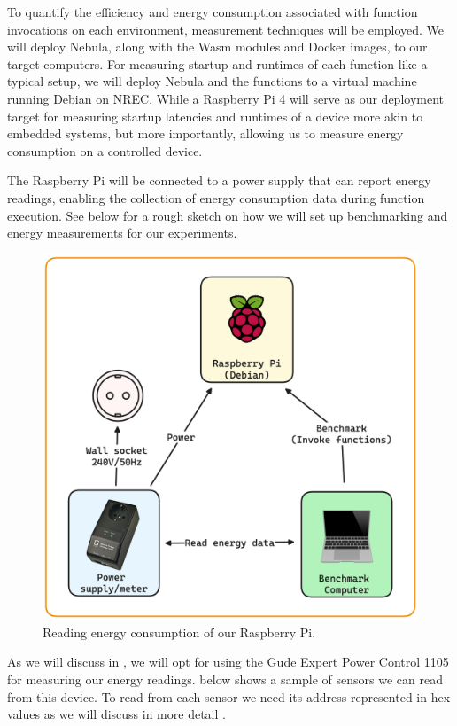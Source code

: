 \documentclass[
  table]{report}
\begin{document}
To quantify the efficiency and energy consumption associated with
function invocations on each environment, measurement techniques will be
employed. We will deploy Nebula, along with the \ac{Wasm} modules and
Docker images, to our target computers. For measuring startup and
runtimes of each function like a typical setup, we will deploy Nebula
and the functions to a virtual machine running Debian on \ac{NREC}.
While a Raspberry Pi 4 will serve as our deployment target for measuring
startup latencies and runtimes of a device more akin to embedded
systems, but more importantly, allowing us to measure energy consumption
on a controlled device.

The Raspberry Pi will be connected to a power supply that can report
energy readings, enabling the collection of energy consumption data
during function execution. See  below for a
rough sketch on how we will set up benchmarking and energy measurements
for our experiments.

\begin{figure}[H]
\centering
  \includegraphics[width=0.7\columnwidth]{assets/4-benchmark-setup.png}
  \caption{Reading energy consumption of our Raspberry Pi.}
  \label{fig:benchmark-setup}
\end{figure}

As we will discuss in , we will opt for
using the Gude Expert Power Control 1105 for measuring our energy
readings.  below shows a sample of sensors we can
read from this device. To read from each sensor we need its address
represented in hex values as we will discuss in more detail
.
\end{document}
